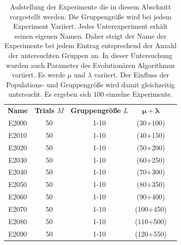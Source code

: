 %
\begin{table} [ht!]	
	\caption[Experimente - Ideale Messdaten]{Aufstellung der Experimente die in diesem Abschnitt vorgestellt werden. Die Gruppengröße wird bei jedem Experiment Variiert. Jedes Unterexperiment erhält seinen eigenen Namen. Daher steigt der Name der Experimente bei jedem Eintrag entsprechend der Anzahl der untersuchten Gruppen an. In dieser Untersuchung wurden auch Parameter des Evolutionären Algorithmus variiert. Es werde $\mu$ und $\lambda$ variiert. Der Einfluss der Populations- und Gruppengröße wird damit gleichzeitig untersucht. Es ergeben sich $100$ einzelne Experimente.}
	\label{tab:experiments}
	\begin{center}
		\begin{tabular}{ccccc}
			\textbf{Name} 	& \textbf{Trials $M$} 	& \textbf{Gruppengröße $L$} & \textbf{$\mathbf{\mu}+\mathbf{\lambda}$}\\
			E2000			& 50 				&    1-10		&  (30+100) \\
			E2010			& 50 				&    1-10		&  (40+150) \\
			E2020			& 50 				&    1-10		&  (50+200) \\
			E2030			& 50 				&    1-10		&  (60+250) \\
			E2040			& 50 				&    1-10		&  (70+300) \\			                        
			E2050			& 50 				&    1-10		&  (80+350) \\			                        
			E2060			& 50 				&    1-10		&  (90+400) \\			                        
			E2070			& 50 				&    1-10		&  (100+450) \\			                        
			E2080			& 50 				&    1-10		&  (110+500) \\			                        
			E2090			& 50 				&    1-10		&  (120+550) \\			                        
%			
		\end{tabular}
	\end{center}
\end{table}
%

